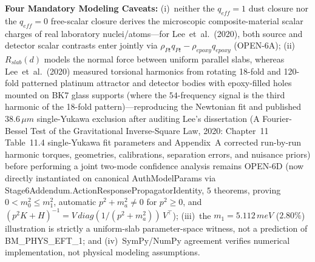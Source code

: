 \documentclass[american,11pt,letterpaper]{article}
\def\mathrm#1{#1}%
\def\texttt#1{#1}%
\def\emph#1{#1}%
\begin{document}
\begin{enumerate}[leftmargin=2em]
\begin{itemize}
  \end{itemize}
  \textbf{Four Mandatory Modeling Caveats:} (i)~neither the $q_{\mathrm{eff}} = 1$ dust closure nor the $q_{\mathrm{eff}} = 0$ free-scalar closure derives the microscopic composite-material scalar charges of real laboratory nuclei/atoms---for Lee~\emph{et~al.}\ (2020), both source and detector scalar contrasts enter jointly via $\rho_{\mathrm{Pt}} q_{\mathrm{Pt}} - \rho_{\mathrm{epoxy}} q_{\mathrm{epoxy}}$ (\texttt{OPEN-6A}); (ii)~$R_{\mathrm{slab}}(d)$ models the normal force between uniform parallel slabs, whereas Lee~\emph{et~al.}\ (2020) measured torsional harmonics from rotating 18-fold and 120-fold patterned platinum attractor and detector bodies with epoxy-filled holes mounted on BK7 glass supports (where the $54$-frequency signal is the third harmonic of the 18-fold pattern)---reproducing the Newtonian fit and published $38.6\,\mu\mathrm{m}$ single-Yukawa exclusion after auditing Lee's dissertation (\emph{A Fourier-Bessel Test of the Gravitational Inverse-Square Law}, 2020: Chapter~11 Table~11.4 single-Yukawa fit parameters and Appendix~A corrected run-by-run harmonic torques, geometries, calibrations, separation errors, and nuisance priors) before performing a joint two-mode confidence analysis remains \texttt{OPEN-6D} (now directly instantiated on canonical \texttt{AuthModelParams} via \texttt{Stage6Addendum.\allowbreak{}ActionResponsePropagatorIdentity}, $5$ theorems, proving $0 < m_0^2 \le m_1^2$, automatic $p^2 + m_a^2 \ne 0$ for $p^2 \ge 0$, and $(p^2 K + H)^{-1} = V\,\mathrm{diag}(1/(p^2+m_a^2))\,V^\top$); (iii)~the $m_1 = 5.112\,\mathrm{meV}$ ($2.80\%$) illustration is strictly a uniform-slab parameter-space witness, not a prediction of \texttt{BM\_PHYS\_EFT\_1}; and (iv)~SymPy/NumPy agreement verifies numerical implementation, not physical modeling assumptions.

\end{enumerate}
\end{document}
